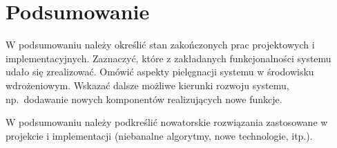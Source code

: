 \chapter*{Podsumowanie}
\thispagestyle{chapterBeginStyle}

W podsumowaniu należy określić stan zakończonych prac projektowych i implementacyjnych. Zaznaczyć, które z zakładanych funkcjonalności systemu udało się zrealizować. Omówić aspekty pielęgnacji systemu w środowisku wdrożeniowym. Wskazać dalsze możliwe kierunki rozwoju systemu, np.\ dodawanie nowych komponentów realizujących nowe funkcje.

W podsumowaniu należy podkreślić nowatorskie rozwiązania zastosowane w projekcie i implementacji (niebanalne algorytmy, nowe technologie, itp.).

